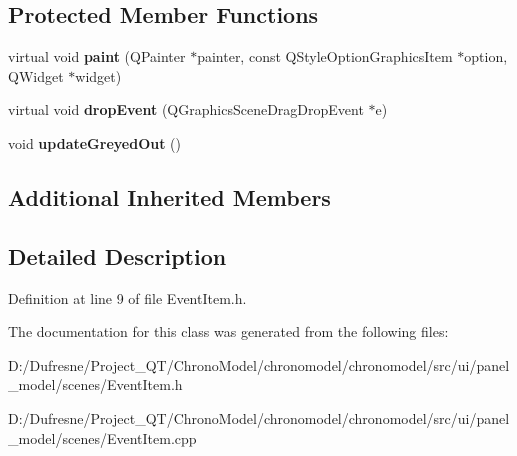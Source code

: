 \subsection*{Protected Member Functions}
\begin{DoxyCompactItemize}
\item 
\hypertarget{class_event_item_af83e0274ce1758e47a104e0ec6a7083a}{virtual void {\bfseries paint} (Q\-Painter $\ast$painter, const Q\-Style\-Option\-Graphics\-Item $\ast$option, Q\-Widget $\ast$widget)}\label{class_event_item_af83e0274ce1758e47a104e0ec6a7083a}

\item 
\hypertarget{class_event_item_a75fd2f541cf994a5eb5761457e58deb4}{virtual void {\bfseries drop\-Event} (Q\-Graphics\-Scene\-Drag\-Drop\-Event $\ast$e)}\label{class_event_item_a75fd2f541cf994a5eb5761457e58deb4}

\item 
\hypertarget{class_event_item_a4c7d13c6cf0511ae8add902e47bc25d7}{void {\bfseries update\-Greyed\-Out} ()}\label{class_event_item_a4c7d13c6cf0511ae8add902e47bc25d7}

\end{DoxyCompactItemize}
\subsection*{Additional Inherited Members}


\subsection{Detailed Description}


Definition at line 9 of file Event\-Item.\-h.



The documentation for this class was generated from the following files\-:\begin{DoxyCompactItemize}
\item 
D\-:/\-Dufresne/\-Project\-\_\-\-Q\-T/\-Chrono\-Model/chronomodel/chronomodel/src/ui/panel\-\_\-model/scenes/Event\-Item.\-h\item 
D\-:/\-Dufresne/\-Project\-\_\-\-Q\-T/\-Chrono\-Model/chronomodel/chronomodel/src/ui/panel\-\_\-model/scenes/Event\-Item.\-cpp\end{DoxyCompactItemize}
